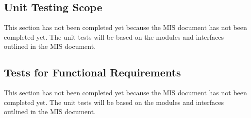 \documentclass[12pt, titlepage]{article}
\begin{document}



\subsection{Unit Testing Scope}

This section has not been completed yet because the MIS document has not been
completed yet. The unit tests will be based on the modules and interfaces
outlined in the MIS document.


\subsection{Tests for Functional Requirements}

This section has not been completed yet because the MIS document has not been
completed yet. The unit tests will be based on the modules and interfaces
outlined in the MIS document.


\end{document}
